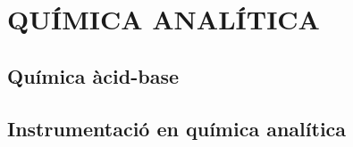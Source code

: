 \chapter{QUÍMICA ANALÍTICA}

\section{Química àcid-base}
\section{Instrumentació en química analítica}
